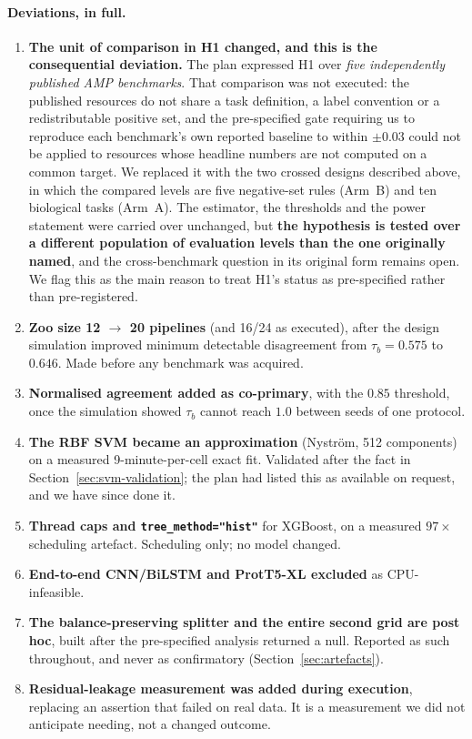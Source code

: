 \documentclass[11pt,a4paper]{article}
\begin{document}
\paragraph{Deviations, in full.}
\begin{enumerate}[leftmargin=1.6em,itemsep=2pt]
\item \textbf{The unit of comparison in H1 changed, and this is the consequential
  deviation.} The plan expressed H1 over \emph{five independently published AMP
  benchmarks}. That comparison was not executed: the published resources do not share a
  task definition, a label convention or a redistributable positive set, and the
  pre-specified gate requiring us to reproduce each benchmark's own reported baseline to
  within $\pm 0.03$ could not be applied to resources whose headline numbers are not
  computed on a common target. We replaced it with the two crossed designs described
  above, in which the compared levels are five negative-set rules (Arm~B) and ten
  biological tasks (Arm~A). The estimator, the thresholds and the power statement were
  carried over unchanged, but \textbf{the hypothesis is tested over a different population
  of evaluation levels than the one originally named}, and the cross-benchmark question in
  its original form remains open. We flag this as the main reason to treat H1's status as
  pre-specified rather than pre-registered.
\item \textbf{Zoo size 12 $\to$ 20 pipelines} (and 16/24 as executed), after the design
  simulation improved minimum detectable disagreement from $\tau_b = 0.575$ to $0.646$.
  Made before any benchmark was acquired.
\item \textbf{Normalised agreement added as co-primary}, with the $0.85$ threshold, once
  the simulation showed $\tau_b$ cannot reach $1.0$ between seeds of one protocol.
\item \textbf{The RBF SVM became an approximation} (Nystr\"om, 512 components) on a
  measured 9-minute-per-cell exact fit. Validated after the fact in
  Section~\ref{sec:svm-validation}; the plan had listed this as available on request, and
  we have since done it.
\item \textbf{Thread caps and \texttt{tree\_method="hist"}} for XGBoost, on a measured
  $97\times$ scheduling artefact. Scheduling only; no model changed.
\item \textbf{End-to-end CNN/BiLSTM and ProtT5-XL excluded} as CPU-infeasible.
\item \textbf{The balance-preserving splitter and the entire second grid are post hoc},
  built after the pre-specified analysis returned a null. Reported as such throughout, and
  never as confirmatory (Section~\ref{sec:artefacts}).
\item \textbf{Residual-leakage measurement was added during execution}, replacing an
  assertion that failed on real data. It is a measurement we did not anticipate needing,
  not a changed outcome.
\end{enumerate}
\end{document}
